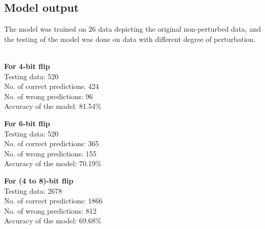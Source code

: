 \documentclass[12pt,a4paper,bold]{thesis}
\theoremstyle{thm}
\theoremstyle{definition}
\begin{document}
\subsection{Model output}
The model was trained on 26 data depicting the original non-perturbed data, and the testing of the model was done on data with different degree of perturbation.\\\\
\begin{minipage}{0.5\linewidth}
\textbf{For 4-bit flip}\\
Testing data: 520\\
No. of correct predictions: 424\\
No. of wrong predictions: 96\\
Accuracy of the model: 81.54\%   \\
\end{minipage}
\hfill
\begin{minipage}{0.6\linewidth}
\textbf{For 6-bit flip}\\
Testing data: 520\\
No. of correct predictions: 365\\
No. of wrong predictions: 155\\
Accuracy of the model: 70.19\%   \\
\end{minipage}
\begin{minipage}{0.6\linewidth}
\textbf{For (4 to 8)-bit flip}\\
Testing data: 2678\\
No. of correct predictions: 1866\\
No. of wrong predictions: 812\\
Accuracy of the model: 69.68\%   \\
\end{minipage}

  
\end{document}
